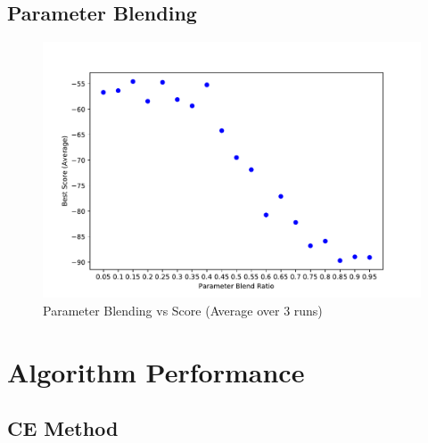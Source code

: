 \documentclass[conference,letterpaper]{IEEEtran}
\begin{document}
\subsection{Parameter Blending}
\begin{figure}[H]
    \includegraphics[scale=0.45]{CE_blending}
    \caption{Parameter Blending vs Score (Average over 3 runs)}
    \label{ce blending}
\end{figure}

\section{Algorithm Performance}
\subsection{CE Method}
\end{document}
